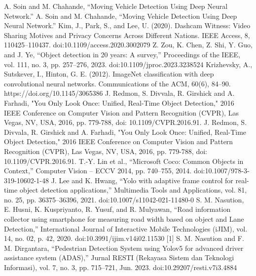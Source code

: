 \documentclass[conference]{IEEEtran}
\begin{document}

\begin{thebibliography}{00}
 A. Soin and M. Chahande, “Moving Vehicle Detection Using Deep Neural Network.” A. Soin and M. Chahande, “Moving Vehicle Detection Using Deep Neural Network.” 
 Kim, J., Park, S., and Lee, U. (2020). Dashcam Witness: Video Sharing Motives and Privacy Concerns Across Different Nations. IEEE Access, 8, 110425–110437. doi:10.1109/access.2020.3002079 
 Z. Zou, K. Chen, Z. Shi, Y. Guo, and J. Ye, “Object detection in 20 years: A survey,” Proceedings of the IEEE, vol. 111, no. 3, pp. 257–276, 2023. doi:10.1109/jproc.2023.3238524 
 Krizhevsky, A., Sutskever, I., Hinton, G. E. (2012). ImageNet classification with deep convolutional neural networks. Communications of the ACM, 60(6), 84–90. https://doi.org/10.1145/3065386
J. Redmon, S. Divvala, R. Girshick and A. Farhadi, "You Only Look Once: Unified, Real-Time Object Detection," 2016 IEEE Conference on Computer Vision and Pattern Recognition (CVPR), Las Vegas, NV, USA, 2016, pp. 779-788, doi: 10.1109/CVPR.2016.91.
J. Redmon, S. Divvala, R. Girshick and A. Farhadi, "You Only Look Once: Unified, Real-Time Object Detection," 2016 IEEE Conference on Computer Vision and Pattern Recognition (CVPR), Las Vegas, NV, USA, 2016, pp. 779-788, doi: 10.1109/CVPR.2016.91.
 T.-Y. Lin et al., “Microsoft Coco: Common Objects in Context,” Computer Vision – ECCV 2014, pp. 740–755, 2014. doi:10.1007/978-3-319-10602-1-48
 J. Lee and K. Hwang, “Yolo with adaptive frame control for real-time object detection applications,” Multimedia Tools and Applications, vol. 81, no. 25, pp. 36375–36396, 2021. doi:10.1007/s11042-021-11480-0
 S. M. Nasution, E. Husni, K. Kuspriyanto, R. Yusuf, and R. Mulyawan, “Road information collector using smartphone for measuring road width based on object and Lane Detection,” International Journal of Interactive Mobile Technologies (iJIM), vol. 14, no. 02, p. 42, 2020. doi:10.3991/ijim.v14i02.11530 
[1] S. M. Nasution and F. M. Dirgantara, “Pedestrian Detection System using Yolov5 for advanced driver assistance system (ADAS),” Jurnal RESTI (Rekayasa Sistem dan Teknologi Informasi), vol. 7, no. 3, pp. 715–721, Jun. 2023. doi:10.29207/resti.v7i3.4884 
\end{thebibliography}
\vspace{12pt}
\color{red}
\end{document}
